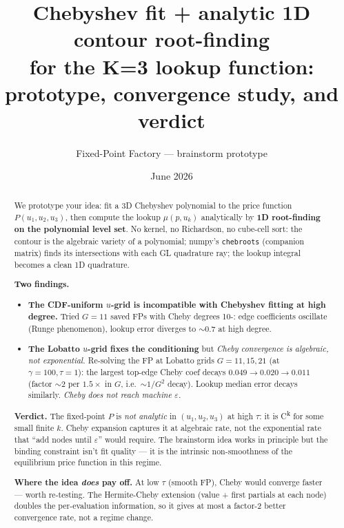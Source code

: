 \documentclass[11pt]{article}
\title{Chebyshev fit + analytic 1D contour root-finding\\
       for the K=3 lookup function:\\
       prototype, convergence study, and verdict}
\author{Fixed-Point Factory --- brainstorm prototype}
\date{June 2026}
\begin{document}
\maketitle

\begin{abstract}
\noindent
We prototype your idea: fit a 3D Chebyshev polynomial to the price function
$P(u_1, u_2, u_3)$, then compute the lookup $\mu(p, u_k)$ analytically by
\textbf{1D root-finding on the polynomial level set}. No kernel, no
Richardson, no cube-cell sort: the contour is the algebraic variety of a
polynomial; numpy's \texttt{chebroots} (companion matrix) finds its
intersections with each GL quadrature ray; the lookup integral becomes a
clean 1D quadrature.

\textbf{Two findings.}
\begin{itemize}
  \item \textbf{The CDF-uniform $u$-grid is incompatible with Chebyshev
        fitting at high degree.} Tried $G{=}11$ saved FPs with Cheby degrees
        10\!-: edge coefficients oscillate (Runge phenomenon),
        lookup error diverges to $\sim 0.7$ at high degree.
  \item \textbf{The Lobatto $u$-grid fixes the conditioning} but
        \emph{Cheby convergence is algebraic, not exponential.}
        Re-solving the FP at Lobatto grids $G{=}11, 15, 21$ (at
        $\gamma{=}100, \tau{=}1$): the largest top-edge Cheby coef decays
        $0.049 \to 0.020 \to 0.011$ (factor $\sim 2$ per $1.5\times$ in $G$,
        i.e.\ $\sim 1/G^2$ decay). Lookup median error decays similarly.
        \emph{Cheby does not reach machine $\varepsilon$.}
\end{itemize}

\textbf{Verdict.} The fixed-point $P$ is \emph{not analytic} in $(u_1, u_2, u_3)$ at
high $\tau$: it is C\textsuperscript{k} for some small finite $k$. Cheby
expansion captures it at algebraic rate, not the exponential rate that
``add nodes until $\varepsilon$'' would require. The brainstorm idea works
in principle but the binding constraint isn't fit quality --- it is the
intrinsic non-smoothness of the equilibrium price function in this regime.

\textbf{Where the idea \emph{does} pay off.} At low $\tau$ (smooth FP),
Cheby would converge faster --- worth re-testing. The Hermite-Cheby
extension (value + first partials at each node) doubles the per-evaluation
information, so it gives at most a factor-2 better convergence rate, not
a regime change.


\end{abstract}
\end{document}
